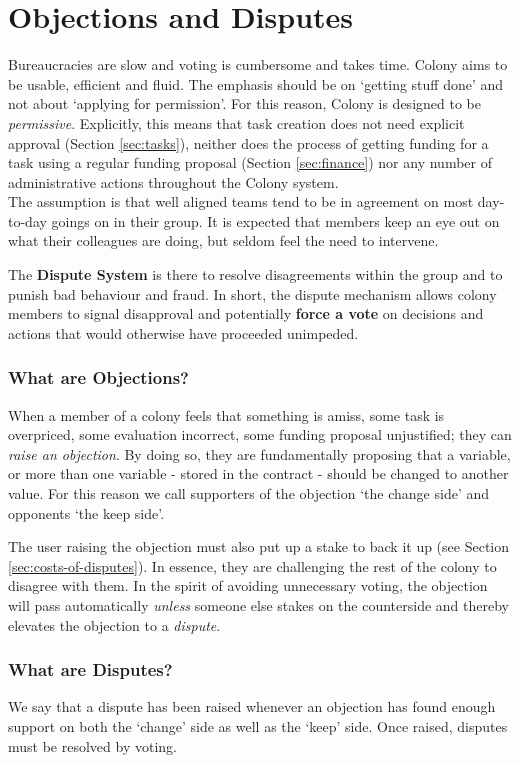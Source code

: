 \section{Objections and Disputes}\label{sec:disputes}\label{sec:objections-and-disputes}
Bureaucracies are slow and voting is cumbersome and takes time. Colony aims to be usable, efficient and fluid. The emphasis should be on `getting stuff done' and not about `applying for permission'. For this reason, Colony is designed to be \emph{permissive}. Explicitly, this means that task creation does not need explicit approval (Section \ref{sec:tasks}), neither does the process of getting funding for a task using a regular funding proposal (Section \ref{sec:finance}) nor any number of administrative actions throughout the Colony system.\\
The assumption is that well aligned teams tend to be in agreement on most day-to-day goings on in their group. It is expected that members keep an eye out on what their colleagues are doing, but seldom feel the need to intervene. 

The \textbf{Dispute System} is there to resolve disagreements within the group and to punish bad behaviour and fraud. In short, the dispute mechanism allows colony members to signal disapproval and potentially \textbf{force a vote} on decisions and actions that would otherwise have proceeded unimpeded.


\subsubsection*{What are Objections?}
When a member of a colony feels that something is amiss, some task is overpriced, some evaluation incorrect, some funding proposal unjustified; they can \emph{raise an objection}. By doing so, they are fundamentally proposing that a variable, or more than one variable - stored in the  contract - should be changed to another value. For this reason we call supporters of the objection `the change side' and opponents `the keep side'.

The user raising the objection must also put up a stake to back it up (see Section \ref{sec:costs-of-disputes}). In essence, they are challenging the rest of the colony to disagree with them. In the spirit of avoiding unnecessary voting, the objection will pass automatically \emph{unless} someone else stakes on the counterside and thereby elevates the objection to a \emph{dispute}.

\subsubsection*{What are Disputes?}
We say that a dispute has been raised whenever an objection has found enough support on both the `change' side as well as the `keep' side. Once raised, disputes must be resolved by voting. 

